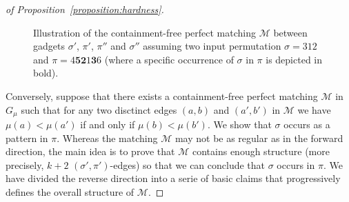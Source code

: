 \documentclass[a4paper]{llncs}
\begin{document}
\begin{proof}[of Proposition~\ref{proposition:hardness}]
\begin{figure}[t!]
\begin{tikzpicture}
        \end{tikzpicture}
        \caption{\label{fig:subfig:sigma' - pi' - pi'' - sigma''}%
        Illustration of the containment-free perfect matching $\mathcal{M}$
        between gadgets $\sigma'$, $\pi'$, $\pi''$ and $\sigma''$ assuming two
        input permutation $\sigma = 312$ and $\pi = 4\mathbf{5}\mathbf{2}1\mathbf{3}6$
        (where a specific occurrence of $\sigma$ in $\pi$ is depicted in bold).
        }
      \end{figure}

  Conversely, suppose that there exists a containment-free perfect matching
  $\mathcal{M}$ in $G_\mu$ such that for any two disctinct edges
  $(a, b)$ and $(a', b')$ in $\mathcal{M}$
  we have $\mu(a) < \mu(a')$ if and only if $\mu(b) < \mu(b')$.
  We show that $\sigma$ occurs as a pattern in $\pi$.
  Whereas the matching $\mathcal{M}$ may not be as regular as in the forward
  direction, the main idea is to prove that $\mathcal{M}$ contains enough structure
  (more precisely, $k+2$ $(\sigma', \pi')$-edges) so that we can conclude
  that $\sigma$ occurs in $\pi$.
  We have divided the reverse direction into a serie of basic claims that
  progressively defines the overall structure of $\mathcal{M}$.


\end{proof}
\end{document}
